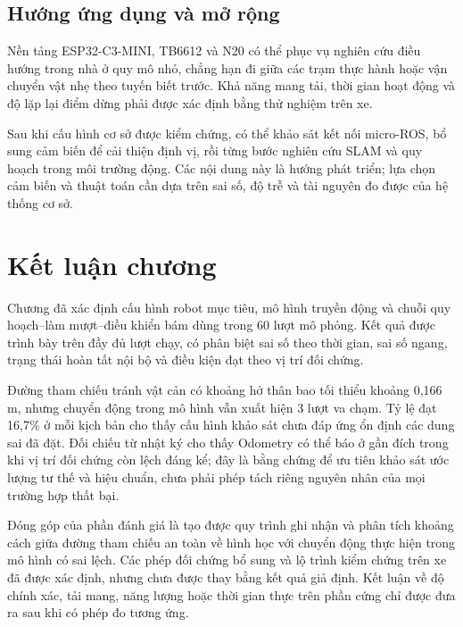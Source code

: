 \documentclass[12pt,a4paper,oneside]{report}
\begin{document}
\subsection{Hướng ứng dụng và mở rộng}

Nền tảng ESP32-C3-MINI, TB6612 và N20 có thể phục vụ nghiên cứu điều hướng trong nhà ở quy mô nhỏ, chẳng hạn đi giữa các trạm thực hành hoặc vận chuyển vật nhẹ theo tuyến biết trước. Khả năng mang tải, thời gian hoạt động và độ lặp lại điểm dừng phải được xác định bằng thử nghiệm trên xe.

Sau khi cấu hình cơ sở được kiểm chứng, có thể khảo sát kết nối micro-ROS, bổ sung cảm biến để cải thiện định vị, rồi từng bước nghiên cứu SLAM và quy hoạch trong môi trường động. Các nội dung này là hướng phát triển; lựa chọn cảm biến và thuật toán cần dựa trên sai số, độ trễ và tài nguyên đo được của hệ thống cơ sở.

\section{Kết luận chương}

Chương đã xác định cấu hình robot mục tiêu, mô hình truyền động và chuỗi quy hoạch--làm mượt--điều khiển bám dùng trong 60 lượt mô phỏng. Kết quả được trình bày trên đầy đủ lượt chạy, có phân biệt sai số theo thời gian, sai số ngang, trạng thái hoàn tất nội bộ và điều kiện đạt theo vị trí đối chứng.

Đường tham chiếu tránh vật cản có khoảng hở thân bao tối thiểu khoảng 0,166 m, nhưng chuyển động trong mô hình vẫn xuất hiện 3 lượt va chạm. Tỷ lệ đạt 16,7\% ở mỗi kịch bản cho thấy cấu hình khảo sát chưa đáp ứng ổn định các dung sai đã đặt. Đối chiếu từ nhật ký cho thấy Odometry có thể báo ở gần đích trong khi vị trí đối chứng còn lệch đáng kể; đây là bằng chứng để ưu tiên khảo sát ước lượng tư thế và hiệu chuẩn, chưa phải phép tách riêng nguyên nhân của mọi trường hợp thất bại.

Đóng góp của phần đánh giá là tạo được quy trình ghi nhận và phân tích khoảng cách giữa đường tham chiếu an toàn về hình học với chuyển động thực hiện trong mô hình có sai lệch. Các phép đối chứng bổ sung và lộ trình kiểm chứng trên xe đã được xác định, nhưng chưa được thay bằng kết quả giả định. Kết luận về độ chính xác, tải mang, năng lượng hoặc thời gian thực trên phần cứng chỉ được đưa ra sau khi có phép đo tương ứng.
\end{document}
